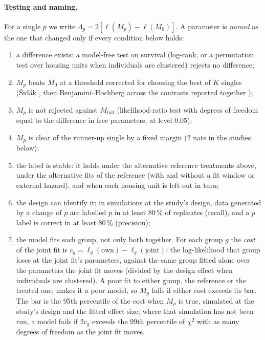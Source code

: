 \paragraph{Testing and naming.} For a single $p$ we write $\Lambda_p=2[\ell(M_p)-\ell(M_0)]$. A parameter is
\emph{named} as the one that changed only if every condition below holds:
\begin{enumerate}[leftmargin=1.5em,itemsep=1pt]
  \item a difference exists: a model-free test on survival (log-rank, or a permutation test over housing units
    when individuals are clustered) rejects no difference;
  \item $M_p$ beats $M_0$ at a threshold corrected for choosing the best of $K$ singles (Šidák
    \citep{sidak1967rectangular}, then Benjamini--Hochberg across the contrasts reported together
    \citep{benjamini1995controlling});
  \item $M_p$ is not rejected against $M_\text{full}$ (likelihood-ratio test with degrees of freedom equal to the
    difference in free parameters, at level 0.05);
  \item $M_p$ is clear of the runner-up single by a fixed margin (2 nats in the studies below);
  \item the label is stable: it holds under the alternative reference treatments above, under the alternative fits
    of the reference (with and without a fit window or external hazard), and when each housing unit is left out in
    turn;
  \item the design can identify it: in simulations at the study's design, data generated by a change of $p$ are
    labelled $p$ in at least 80\,\% of replicates (recall), and a $p$ label is correct in at least 80\,\% (precision);
  \item the model fits each group, not only both together. For each group $g$ the \emph{cost} of the joint fit is
    $c_g=\ell_g(\text{own})-\ell_g(\text{joint})$: the log-likelihood that group loses at the joint fit's parameters,
    against the same group fitted alone over the parameters the joint fit moves (divided by the design effect when
    individuals are clustered). A poor fit to either group, the reference or the treated one, makes it a poor model,
    so $M_p$ fails if either cost exceeds its bar. The bar is the 95th percentile of the cost when $M_p$ is true,
    simulated at the study's design and the fitted effect size; where that simulation has not been run, a model fails
    if $2c_g$ exceeds the 99th percentile of $\chi^2$ with as many degrees of freedom as the joint fit moves.
\end{enumerate}
